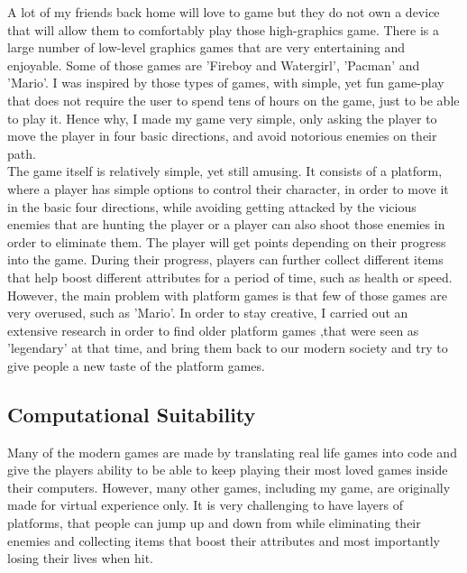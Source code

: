 \documentclass[12pt]{article}
\begin{document}
A lot of my friends back home will love to game but they do not own a device that will allow them to comfortably play those high-graphics game. There is a large number of low-level graphics games that are very entertaining and enjoyable. Some of those games are 'Fireboy and Watergirl', 'Pacman' and 'Mario'. I was inspired by those types of games, with  simple, yet fun game-play that does not require the user to spend tens of hours on the game, just to be able to play it. Hence why, I made my game very simple, only asking the player to move the player in four basic directions, and avoid notorious enemies on their path. 
\\

The game itself is relatively simple, yet still amusing. It consists of a platform, where a player has simple options to control their character, in order to move it in the basic four directions, while avoiding getting attacked by the vicious enemies that are hunting the player or a player can also shoot those enemies in order to eliminate them. The player will get points depending on their progress into the game. During their progress, players can further collect different items that help boost different attributes for a period of time, such as health or speed. 
\\

However, the main problem with platform games is that few of those games are very overused, such as 'Mario'. In order to stay creative, I carried out an extensive research in order to find older platform games ,that were seen as 'legendary' at that time, and bring them back to our modern society and try to give people a new taste of the platform games.
\newpage

\subsection{Computational Suitability}
Many of the modern games are made by translating real life games into code and give the players ability to be able to keep playing their most loved games inside their computers. However, many other games, including my game, are originally made for virtual experience only. It is very challenging to have layers of platforms, that people can jump up and down from while eliminating their enemies and collecting items that boost their attributes and most importantly losing their lives when hit. 
\\
\end{document}
